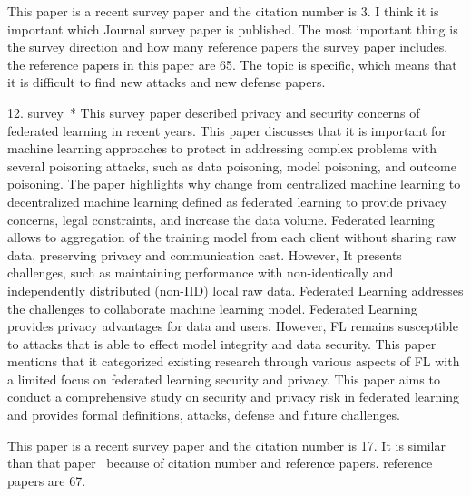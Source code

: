 \documentclass[manuscript,screen,review]{acmart}
\begin{document}
This paper is a recent survey paper and the citation number is 3. I think it is important which Journal survey paper is published. The most important thing is the survey direction and how many reference papers the survey paper includes. the reference papers in this paper are 65. The topic is specific, which means that it is difficult to find new attacks and new defense papers.   



12. survey~\cite{gosselin2022privacy}*
This survey paper described privacy and security concerns of federated learning in recent years. This paper discusses that it is important for machine learning approaches to protect in addressing complex problems with several poisoning attacks, such as data poisoning, model poisoning, and outcome poisoning. The paper highlights why change from centralized machine learning to decentralized machine learning defined as federated learning to provide privacy concerns, legal constraints, and increase the data volume. Federated learning allows to aggregation of the training model from each client without sharing raw data, preserving privacy and communication cast. However, It presents challenges, such as maintaining performance with non-identically and independently distributed (non-IID) local raw data. 
Federated Learning addresses the challenges to collaborate machine learning model. Federated Learning provides privacy advantages for data and users. However, FL remains susceptible to attacks that is able to effect model integrity and data security. This paper mentions that it categorized existing research through various aspects of FL with a limited focus on federated learning security and privacy. This paper aims to conduct a comprehensive study on security and privacy risk in federated learning and provides formal definitions, attacks, defense and future challenges. 

This paper is a recent survey paper and the citation number is 17. It is similar than that paper~\cite{xia2023poisoning} because of citation number and reference papers. reference papers are 67. 









\appendix
\end{document}
